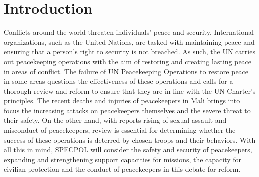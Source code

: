 \chapter{Introduction}

Conflicts around the world threaten individuals’ peace and security. International organizations, such as the United Nations, are tasked with maintaining peace and ensuring that a person’s right to security is not breached. As such, the UN carries out peacekeeping operations with the aim of restoring and creating lasting peace in areas of conflict. The failure of UN Peacekeeping Operations to restore peace in some areas questions the effectiveness of these operations and calls for a thorough review and reform to ensure that they are in line with the UN Charter’s principles. The recent deaths and injuries of peacekeepers in Mali brings into focus the increasing attacks on peacekeepers themselves and the severe threat to their safety. On the other hand, with reports rising of sexual assault and misconduct of peacekeepers, review is essential for determining whether the success of these operations is deterred by chosen troops and their behaviors. With all this in mind, SPECPOL will consider the safety and security of peacekeepers, expanding and strengthening support capacities for missions, the capacity for civilian protection and the conduct of peacekeepers in this debate for reform.